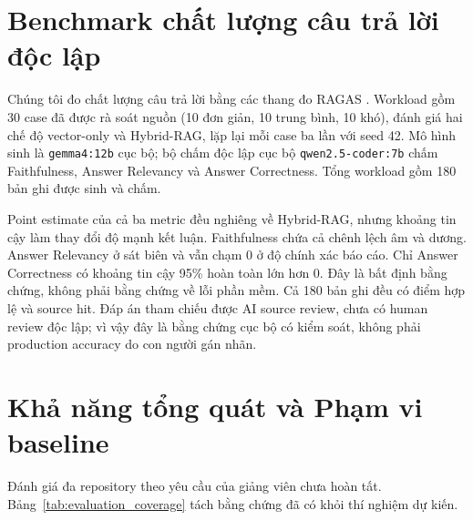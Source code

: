 \documentclass[12pt,a4paper,oneside]{report}
\begin{document}
\section{Benchmark chất lượng câu trả lời độc lập}
Chúng tôi đo chất lượng câu trả lời bằng các thang đo RAGAS \cite{shahul2023ragas}. Workload gồm 30 case đã được rà soát nguồn (10 đơn giản, 10 trung bình, 10 khó), đánh giá hai chế độ vector-only và Hybrid-RAG, lặp lại mỗi case ba lần với seed 42. Mô hình sinh là \texttt{gemma4:12b} cục bộ; bộ chấm độc lập cục bộ \texttt{qwen2.5-coder:7b} chấm Faithfulness, Answer Relevancy và Answer Correctness. Tổng workload gồm 180 bản ghi được sinh và chấm.

\begin{table}[H]
    \centering
    \caption{Chất lượng câu trả lời với khoảng tin cậy ghép cặp 95\% theo case}
    \label{tab:answer_quality_results}
\end{table}

Point estimate của cả ba metric đều nghiêng về Hybrid-RAG, nhưng khoảng tin cậy làm thay đổi độ mạnh kết luận. Faithfulness chứa cả chênh lệch âm và dương. Answer Relevancy ở sát biên và vẫn chạm 0 ở độ chính xác báo cáo. Chỉ Answer Correctness có khoảng tin cậy 95\% hoàn toàn lớn hơn 0. Đây là bất định bằng chứng, không phải bằng chứng về lỗi phần mềm. Cả 180 bản ghi đều có điểm hợp lệ và source hit. Đáp án tham chiếu được AI source review, chưa có human review độc lập; vì vậy đây là bằng chứng cục bộ có kiểm soát, không phải production accuracy do con người gán nhãn.

\section{Khả năng tổng quát và Phạm vi baseline}
Đánh giá đa repository theo yêu cầu của giảng viên chưa hoàn tất. Bảng~\ref{tab:evaluation_coverage} tách bằng chứng đã có khỏi thí nghiệm dự kiến.
\end{document}
